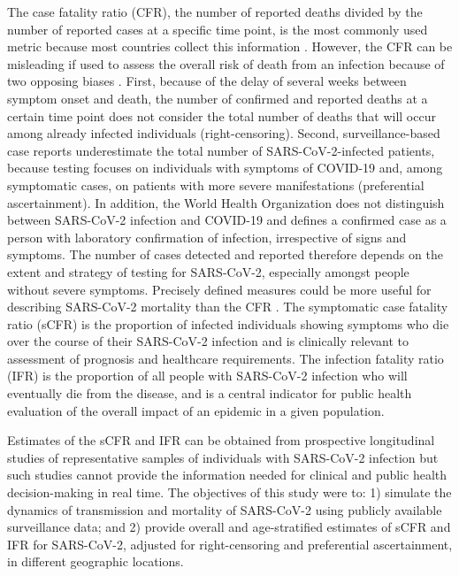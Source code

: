 \documentclass{article}
\begin{document}
The case fatality ratio (CFR), the number of reported deaths divided by the number of reported cases at a specific time point, is the most commonly used metric because most countries collect this information \cite{whospeech,wang2020novel}. 
However, the CFR can be misleading if used to assess the overall risk of death from an infection because of two opposing biases \cite{Lipsitch2015,Battegay2020}. 
First, because of the delay of several weeks between symptom onset and death, the number of confirmed and reported deaths at a certain time point does not consider the total number of deaths that will occur among already infected individuals (right-censoring). 
Second, surveillance-based case reports underestimate the total number of SARS-CoV-2-infected patients, because testing focuses on individuals with symptoms of COVID-19 and, among symptomatic cases, on patients with more severe manifestations (preferential ascertainment). 
In addition, the World Health Organization does not distinguish between SARS-CoV-2 infection and COVID-19 and defines a confirmed case as a person with laboratory confirmation of infection, irrespective of signs and symptoms. 
The number of cases detected and reported therefore depends on the extent and strategy of testing for SARS-CoV-2, especially amongst people without severe symptoms. 
Precisely defined measures could be more useful for describing SARS-CoV-2 mortality than the CFR \cite{Lipsitch2015}. 
The symptomatic case fatality ratio (sCFR) is the proportion of infected individuals showing symptoms who die over the course of their SARS-CoV-2 infection and is clinically relevant to assessment of prognosis and healthcare requirements. 
The infection fatality ratio (IFR) is the proportion of all people with SARS-CoV-2 infection who will eventually die from the disease, and is a central indicator for public health evaluation of the overall impact of an epidemic in a given population. 

Estimates of the sCFR and IFR can be obtained from prospective longitudinal studies of representative samples of individuals with SARS-CoV-2 infection but such studies cannot provide the information needed for clinical and public health decision-making in real time. 
The objectives of this study were to: 1) simulate the dynamics of transmission and mortality of SARS-CoV-2 using publicly available surveillance data; and 2) provide overall and age-stratified estimates of sCFR and IFR for SARS-CoV-2, adjusted for right-censoring and preferential ascertainment, in different geographic locations.
\end{document}

